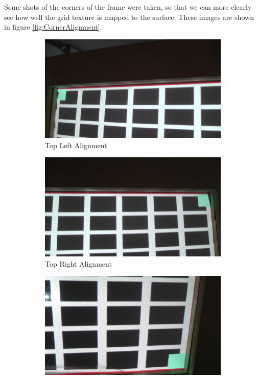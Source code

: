\documentclass[]{article}
\begin{document}
Some shots of the corners of the frame were taken, so that we can more clearly see how well the grid texture is mapped to the surface. These images are shown in figure \ref{fig:CornerAlignment}.
\begin{figure}[hbtp] 
  \begin{subfigure}[b]{0.5\linewidth}
    \centering
    \includegraphics[width=0.75\linewidth]{figures/TopLeft2.JPG} 
    \caption{Top Left Alignment} 
    \label{fig:TLA} 
    \vspace{4ex}
  \end{subfigure}%
  \begin{subfigure}[b]{0.5\linewidth}
    \centering
    \includegraphics[width=0.75\linewidth]{figures/TopRight.JPG} 
    \caption{Top Right Alignment} 
    \label{fig:TRA} 
    \vspace{4ex}
  \end{subfigure} 
  \begin{subfigure}[b]{0.5\linewidth}
    \centering
    \includegraphics[width=0.75\linewidth]{figures/BottomRight.JPG} 

\end{subfigure}
\end{figure}
\end{document}
